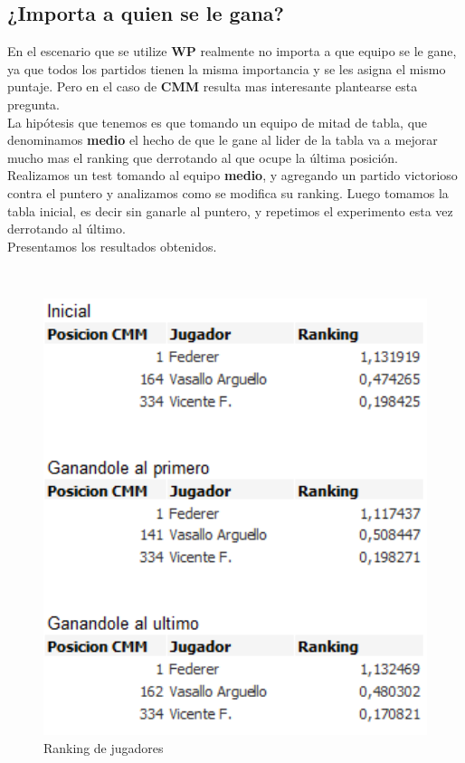 \subsection{¿Importa a quien se le gana?}


En el escenario que se utilize \textbf{WP} realmente no importa a que equipo se le gane, ya que todos los partidos tienen la misma importancia y se les asigna el mismo puntaje. Pero en el caso de \textbf{CMM} resulta mas interesante plantearse esta pregunta. \\

La hipótesis que tenemos es que tomando un equipo de mitad de tabla, que denominamos \textbf{medio} el hecho de que le gane al lider de la tabla va a mejorar mucho mas el ranking que derrotando al que ocupe la última posición. \\

Realizamos un test tomando al equipo \textbf{medio}, y agregando un partido victorioso contra el puntero y analizamos como se modifica su ranking. Luego tomamos la tabla inicial, es decir sin ganarle al puntero, y repetimos el experimento esta vez derrotando al último. \\

Presentamos los resultados obtenidos.

\\


\begin{figure}[H]
\centering
\includegraphics[width=1\textwidth]{IMG/rank a quien le gano.png}
\caption{Ranking de jugadores}
\label{fig:Ranking de jugadores}
\end{figure}
\\

